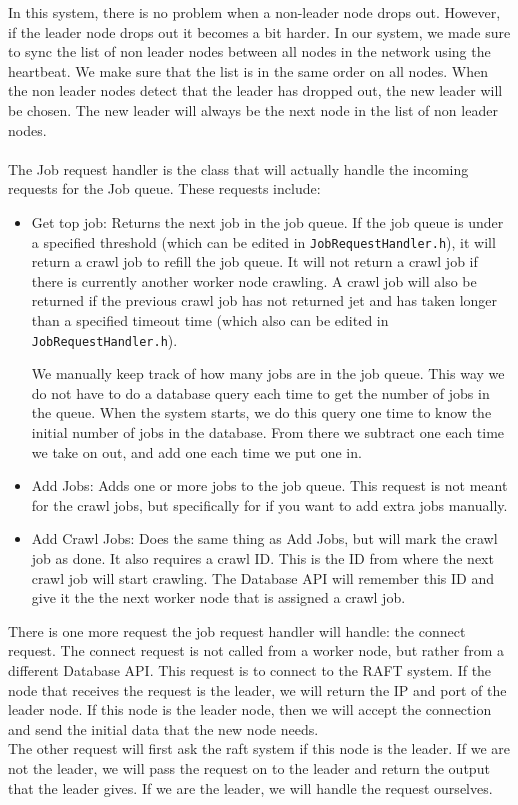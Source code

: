 \documentclass[../Main.tex]{subfiles}
\begin{document}
In this system, there is no problem when a non-leader node drops out. However, if the leader node drops out it becomes a bit harder. In our system, we made sure to sync the list of non leader nodes between all nodes in the network using the heartbeat. We make sure that the list is in the same order on all nodes. When the non leader nodes detect that the leader has dropped out, the new leader will be chosen. The new leader will always be the next node in the list of non leader nodes.\\\\
The Job request handler is the class that will actually handle the incoming requests for the Job queue. These requests include:
\begin{itemize}
    \item Get top job: Returns the next job in the job queue. If the job queue is under a specified threshold (which can be edited in \texttt{JobRequestHandler.h}), it will return a crawl job to refill the job queue. It will not return a crawl job if there is currently another worker node crawling. A crawl job will also be returned if the previous crawl job has not returned jet and has taken longer than a specified timeout time (which also can be edited in \texttt{JobRequestHandler.h}).
    
    We manually keep track of how many jobs are in the job queue. This way we do not have to do a database query each time to get the number of jobs in the queue. When the system starts, we do this query one time to know the initial number of jobs in the database. From there we subtract one each time we take on out, and add one each time we put one in. 
    \item Add Jobs: Adds one or more jobs to the job queue. This request is not meant for the crawl jobs, but specifically for if you want to add extra jobs manually.
    \item Add Crawl Jobs: Does the same thing as Add Jobs, but will mark the crawl job as done. It also requires a crawl ID. This is the ID from where the next crawl job will start crawling. The Database API will remember this ID and give it the the next worker node that is assigned a crawl job.
\end{itemize}
There is one more request the job request handler will handle: the connect request. The connect request is not called from a worker node, but rather from a different Database API. This request is to connect to the RAFT system. If the node that receives the request is the leader, we will return the IP and port of the leader node. If this node is the leader node, then we will accept the connection and send the initial data that the new node needs.\\

The other request will first ask the raft system if this node is the leader. If we are not the leader, we will pass the request on to the leader and return the output that the leader gives. If we are the leader, we will handle the request ourselves. 
\end{document}
